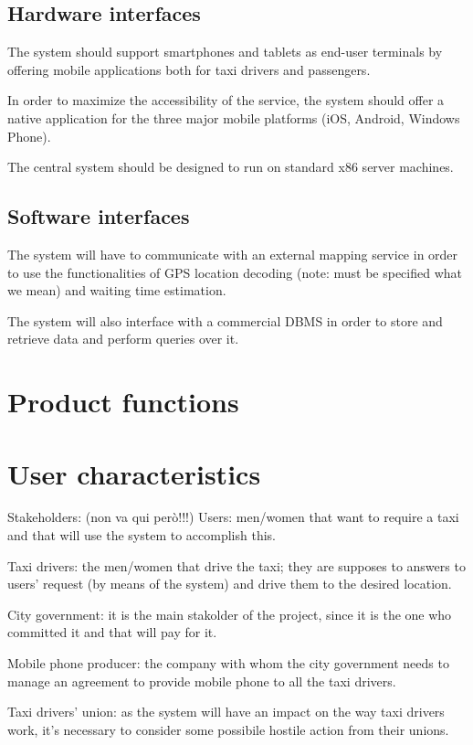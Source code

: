 \subsection{Hardware interfaces}
The system should support smartphones and tablets as end-user terminals by offering mobile applications both for taxi drivers and passengers.

In order to maximize the accessibility of the service, the system should offer a native application for the three major mobile platforms (iOS, Android, Windows Phone).

The central system should be designed to run on standard x86 server machines.


\subsection{Software interfaces}
The system will have to communicate with an external mapping service in order to use the functionalities of GPS location decoding (note: must be specified what we mean) and waiting time estimation.

The system will also interface with a commercial DBMS in order to store and retrieve data and perform queries over it.


\section{Product functions}


\section{User characteristics}
Stakeholders: (non va qui però!!!)
Users: men/women that want to require a taxi and that will use the system to accomplish this.

Taxi drivers: the men/women that drive the taxi; they are supposes to answers to users' request (by means of the system) and drive them to the desired location.

City government: it is the main stakolder of the project, since it is the one who committed it and that will pay for it.

Mobile phone producer: the company with whom the city government needs to manage an agreement  to provide mobile phone to all the taxi drivers.

Taxi drivers’ union: as the system will have an impact on the way taxi drivers work, it's necessary to consider some possibile hostile action from their unions.

